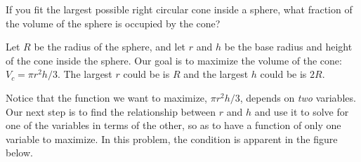 \documentclass{ximera}
\begin{document}
\begin{example}
If you fit the largest possible right circular cone inside a sphere, what fraction of the
volume of the sphere is occupied by the cone?  
\begin{image}
\end{image}
\begin{explanation}
Let $R$ be the radius of the sphere, and let $r$ and $h$ be the base
radius and height of the cone inside the sphere.  Our goal is to
maximize the volume of the cone: $V_c=\pi r^2h/3$.  The largest $r$
could be is $R$ and the largest $h$ could be is $2R$.

Notice that the function we want to maximize, $\pi r^2h/3$, depends on
\textit{two} variables.  Our next step is to find the relationship between $r$ and $h$ and
use it to solve for one of the variables in terms of the other, so as
to have a function of only one variable to maximize.  In this problem,
the condition is apparent in the figure below.


\end{explanation}
\end{example}
\end{document}
